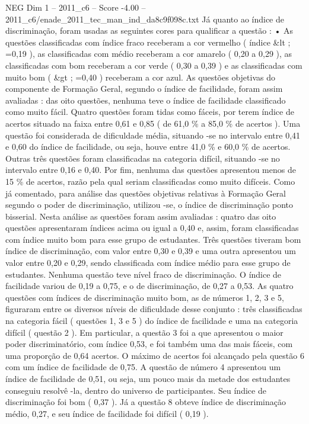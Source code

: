 \begin{textsample}{NEG Dim 1 – 2011\_c6 – Score -4.00 – 2011\_c6/enade\_2011\_tec\_man\_ind\_da8c9f098c.txt}
Já quanto ao índice de discriminação, foram usadas as seguintes cores para qualificar a questão : • As questões classificadas com índice fraco receberam a cor vermelho ( índice \&lt ; =0,19 ), as classificadas com médio receberam a cor amarelo ( 0,20 a 0,29 ), as classificadas com bom receberam a cor verde ( 0,30 a 0,39 ) e as classificadas com muito bom ( \&gt ; =0,40 ) receberam a cor azul.
As questões objetivas do componente de Formação Geral, segundo o índice de facilidade, foram assim avaliadas : das oito questões, nenhuma teve o índice de facilidade classificado como muito fácil.
Quatro questões foram tidas como fáceis, por terem índice de acertos situado na faixa entre 0,61 e 0,85 ( de 61,0 \% a 85,0 \% de acertos ).
Uma questão foi considerada de dificuldade média, situando -se no intervalo entre 0,41 e 0,60 do índice de facilidade, ou seja, houve entre 41,0 \% e 60,0 \% de acertos.
Outras três questões foram classificadas na categoria difícil, situando -se no intervalo entre 0,16 e 0,40.
Por fim, nenhuma das questões apresentou menos de 15 \% de acertos, razão pela qual seriam classificadas como muito difíceis.
Como já comentado, para análise das questões objetivas relativas à Formação Geral segundo o poder de discriminação, utilizou -se, o índice de discriminação ponto bisserial.
Nesta análise as questões foram assim avaliadas : quatro das oito questões apresentaram índices acima ou igual a 0,40 e, assim, foram classificadas com índice muito bom para esse grupo de estudantes.
Três questões tiveram bom índice de discriminação, com valor entre 0,30 e 0,39 e uma outra apresentou um valor entre 0,20 e 0,29, sendo classificada com índice médio para esse grupo de estudantes.
Nenhuma questão teve nível fraco de discriminação.
O índice de facilidade variou de 0,19 a 0,75, e o de discriminação, de 0,27 a 0,53.
As quatro questões com índices de discriminação muito bom, as de números 1, 2, 3 e 5, figuraram entre os diversos níveis de dificuldade desse conjunto : três classificadas na categoria fácil ( questões 1, 3 e 5 ) do índice de facilidade e uma na categoria difícil ( questão 2 ).
Em particular, a questão 3 foi a que apresentou o maior poder discriminatório, com índice 0,53, e foi também uma das mais fáceis, com uma proporção de 0,64 acertos.
O máximo de acertos foi alcançado pela questão 6 com um índice de facilidade de 0,75.
A questão de número 4 apresentou um índice de facilidade de 0,51, ou seja, um pouco mais da metade dos estudantes conseguiu resolvê -la, dentro do universo de participantes.
Seu índice de discriminação foi bom ( 0,37 ).
Já a questão 8 obteve índice de discriminação médio, 0,27, e seu índice de facilidade foi difícil ( 0,19 ).

\end{textsample}
